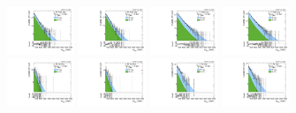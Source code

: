 \begin{figure}[htbp]
  \includegraphics[width=0.18\textwidth]{fig/fitValidation/PostFit_SR_MVV_MJJ070to110__mu_HP_nobb_HDy_Run2.pdf}
  \includegraphics[width=0.18\textwidth]{fig/fitValidation/PostFit_SR_MVV_MJJ070to110__e_HP_nobb_HDy_Run2.pdf}
  \includegraphics[width=0.18\textwidth]{fig/fitValidation/PostFit_SR_MVV_MJJ070to110__mu_LP_nobb_HDy_Run2.pdf}
  \includegraphics[width=0.18\textwidth]{fig/fitValidation/PostFit_SR_MVV_MJJ070to110__e_LP_nobb_HDy_Run2.pdf}\\
  \includegraphics[width=0.18\textwidth]{fig/fitValidation/PostFit_SR_MVV_MJJ070to110__mu_HP_vbf_HDy_Run2.pdf}
  \includegraphics[width=0.18\textwidth]{fig/fitValidation/PostFit_SR_MVV_MJJ070to110__e_HP_vbf_HDy_Run2.pdf}
  \includegraphics[width=0.18\textwidth]{fig/fitValidation/PostFit_SR_MVV_MJJ070to110__mu_LP_vbf_HDy_Run2.pdf}
  \includegraphics[width=0.18\textwidth]{fig/fitValidation/PostFit_SR_MVV_MJJ070to110__e_LP_vbf_HDy_Run2.pdf}\\
  \caption{
  }
  \label{fig:postfit_MVV_MJJ070to110_Run2}
\end{figure}

